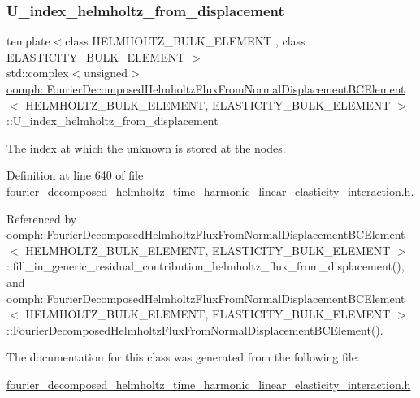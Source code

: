 \subsubsection{\texorpdfstring{U\+\_\+index\+\_\+helmholtz\+\_\+from\+\_\+displacement}{U\_index\_helmholtz\_from\_displacement}}
{\footnotesize\ttfamily template$<$class H\+E\+L\+M\+H\+O\+L\+T\+Z\+\_\+\+B\+U\+L\+K\+\_\+\+E\+L\+E\+M\+E\+NT , class E\+L\+A\+S\+T\+I\+C\+I\+T\+Y\+\_\+\+B\+U\+L\+K\+\_\+\+E\+L\+E\+M\+E\+NT $>$ \\
std\+::complex$<$unsigned$>$ \hyperlink{classoomph_1_1FourierDecomposedHelmholtzFluxFromNormalDisplacementBCElement}{oomph\+::\+Fourier\+Decomposed\+Helmholtz\+Flux\+From\+Normal\+Displacement\+B\+C\+Element}$<$ H\+E\+L\+M\+H\+O\+L\+T\+Z\+\_\+\+B\+U\+L\+K\+\_\+\+E\+L\+E\+M\+E\+NT, E\+L\+A\+S\+T\+I\+C\+I\+T\+Y\+\_\+\+B\+U\+L\+K\+\_\+\+E\+L\+E\+M\+E\+NT $>$\+::U\+\_\+index\+\_\+helmholtz\+\_\+from\+\_\+displacement\hspace{0.3cm}{\ttfamily [private]}}



The index at which the unknown is stored at the nodes. 



Definition at line 640 of file fourier\+\_\+decomposed\+\_\+helmholtz\+\_\+time\+\_\+harmonic\+\_\+linear\+\_\+elasticity\+\_\+interaction.\+h.



Referenced by oomph\+::\+Fourier\+Decomposed\+Helmholtz\+Flux\+From\+Normal\+Displacement\+B\+C\+Element$<$ H\+E\+L\+M\+H\+O\+L\+T\+Z\+\_\+\+B\+U\+L\+K\+\_\+\+E\+L\+E\+M\+E\+N\+T, E\+L\+A\+S\+T\+I\+C\+I\+T\+Y\+\_\+\+B\+U\+L\+K\+\_\+\+E\+L\+E\+M\+E\+N\+T $>$\+::fill\+\_\+in\+\_\+generic\+\_\+residual\+\_\+contribution\+\_\+helmholtz\+\_\+flux\+\_\+from\+\_\+displacement(), and oomph\+::\+Fourier\+Decomposed\+Helmholtz\+Flux\+From\+Normal\+Displacement\+B\+C\+Element$<$ H\+E\+L\+M\+H\+O\+L\+T\+Z\+\_\+\+B\+U\+L\+K\+\_\+\+E\+L\+E\+M\+E\+N\+T, E\+L\+A\+S\+T\+I\+C\+I\+T\+Y\+\_\+\+B\+U\+L\+K\+\_\+\+E\+L\+E\+M\+E\+N\+T $>$\+::\+Fourier\+Decomposed\+Helmholtz\+Flux\+From\+Normal\+Displacement\+B\+C\+Element().



The documentation for this class was generated from the following file\+:\begin{DoxyCompactItemize}
\item 
\hyperlink{fourier__decomposed__helmholtz__time__harmonic__linear__elasticity__interaction_8h}{fourier\+\_\+decomposed\+\_\+helmholtz\+\_\+time\+\_\+harmonic\+\_\+linear\+\_\+elasticity\+\_\+interaction.\+h}\end{DoxyCompactItemize}

